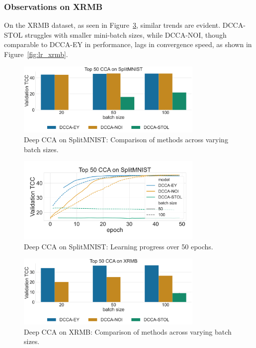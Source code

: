 \subsubsection{Observations on XRMB}
On the XRMB dataset, as seen in Figure~\ref{fig:corr_xrmb}, similar trends are evident.
DCCA-STOL struggles with smaller mini-batch sizes, while DCCA-NOI, though comparable to DCCA-EY in performance, lags in convergence speed, as shown in Figure~\ref{fig:lr_xrmb}.

\begin{figure}
    \centering
    \includegraphics[width=0.8\textwidth]{figures/DCCA/SplitMNIST_models_different_batch_sizes}
    \caption{Deep CCA on SplitMNIST: Comparison of methods across varying batch sizes.}
    \label{fig:corr_mnist}
\end{figure}

\begin{figure}
    \centering
    \includegraphics[width=0.8\textwidth]{figures/DCCA/SplitMNIST_allbatchsizes_pcc}
    \caption{Deep CCA on SplitMNIST: Learning progress over 50 epochs.}
    \label{fig:lr_mnist}
\end{figure}

\begin{figure}
    \centering
    \includegraphics[width=0.8\textwidth]{figures/DCCA/XRMB_models_different_batch_sizes}
    \caption{Deep CCA on XRMB: Comparison of methods across varying batch sizes.}
    \label{fig:corr_xrmb}
\end{figure}

